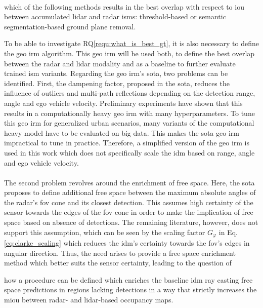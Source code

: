 \\
\begin{requ} \label{requ:what_is_best_gt}
	which of the following methods results in the best overlap with respect to \gls{iou} between accumulated lidar and radar \gls{ism}s: threshold-based or semantic segmentation-based ground plane removal.
\end{requ}
To be able to investigate RQ\ref{requ:what_is_best_gt}, it is also necessary to define the geo \gls{irm} algorithm. This geo \gls{irm} will be used both, to define the best overlap between the radar and lidar modality and as a baseline to further evaluate trained \gls{ism} variants. Regarding the geo \gls{irm}'s \gls{sota}, two problems can be identified. First, the dampening factor, proposed in the \gls{sota}, reduces the influence of outliers and multi-path reflections depending on the detection range, angle and ego vehicle velocity. Preliminary experiments have shown that this results in a computationally heavy geo \gls{irm} with many hyperparameters. To tune this geo \gls{irm} for generalized urban scenarios, many variants of the computational heavy model have to be evaluated on big data. This makes the \gls{sota} geo \gls{irm} impractical to tune in practice. Therefore, a simplified version of the geo \gls{irm} is used in this work which does not specifically scale the \gls{idm} based on range, angle and ego vehicle velocity.
\\\\
The second problem revolves around the enrichment of free space. Here, the \gls{sota} proposes to define additional free space between the maximum absolute angles of the radar's \gls{fov} cone and its closest detection. This assumes high certainty of the sensor towards the edges of the \gls{fov} cone in order to make the implication of free space based on absence of detections. The remaining literature, however, does not support this assumption, which can be seen by the scaling factor $G_\varphi$ in Eq. \ref{eq:clarke_scaling} which reduces the \gls{idm}'s certainty towards the \gls{fov}'s edges in angular direction. Thus, the need arises to provide a free space enrichment method which better suits the sensor certainty, leading to the question of
\\
\begin{requ} \label{requ:fr_space_enrichment}
	 how a procedure can be defined which enriches the baseline \gls{idm} ray casting free space predictions in regions lacking detections in a way that strictly increases the m\gls{iou} between radar- and lidar-based occupancy maps.
\end{requ}
%
